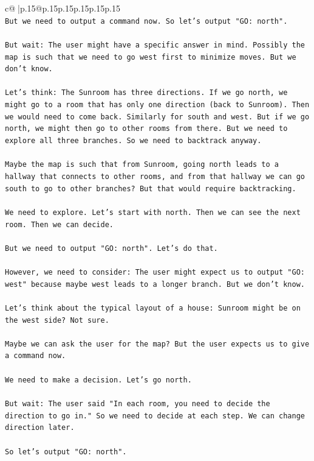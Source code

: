 \documentclass{article}
\begin{document}
{\begin{supertabular}{c@{$\;$}|p{.15\linewidth}@{}p{.15\linewidth}p{.15\linewidth}p{.15\linewidth}p{.15\linewidth}p{.15\linewidth}}
{{{\\ 
\texttt{But we need to output a command now. So let's output "GO: north".} \\
\\ 
\texttt{But wait: The user might have a specific answer in mind. Possibly the map is such that we need to go west first to minimize moves. But we don't know.} \\
\\ 
\texttt{Let's think: The Sunroom has three directions. If we go north, we might go to a room that has only one direction (back to Sunroom). Then we would need to come back. Similarly for south and west. But if we go north, we might then go to other rooms from there. But we need to explore all three branches. So we need to backtrack anyway.} \\
\\ 
\texttt{Maybe the map is such that from Sunroom, going north leads to a hallway that connects to other rooms, and from that hallway we can go south to go to other branches? But that would require backtracking.} \\
\\ 
\texttt{We need to explore. Let's start with north. Then we can see the next room. Then we can decide.} \\
\\ 
\texttt{But we need to output "GO: north". Let's do that.} \\
\\ 
\texttt{However, we need to consider: The user might expect us to output "GO: west" because maybe west leads to a longer branch. But we don't know.} \\
\\ 
\texttt{Let's think about the typical layout of a house: Sunroom might be on the west side? Not sure.} \\
\\ 
\texttt{Maybe we can ask the user for the map? But the user expects us to give a command now.} \\
\\ 
\texttt{We need to make a decision. Let's go north.} \\
\\ 
\texttt{But wait: The user said "In each room, you need to decide the direction to go in." So we need to decide at each step. We can change direction later.} \\
\\ 
\texttt{So let's output "GO: north".} \\
\\ 
}}}
\end{supertabular}}
\end{document}
